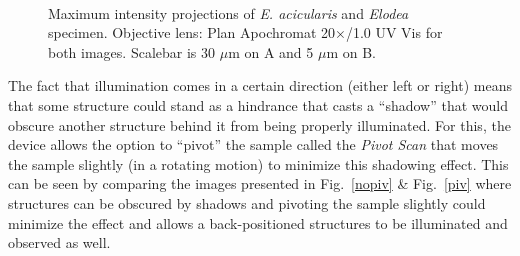\begin{figure}[h!]
\centering
{}\hspace{0.1mm}
\\
\caption{Maximum intensity projections of \textit{E. acicularis} and \textit{Elodea} specimen. 
Objective lens: Plan Apochromat 20$\times$/1.0 UV Vis for both images. 
Scalebar is 30 $\mu$m on A and 5 $\mu$m on B.}
\label{fig:EEmip}
\end{figure}

The fact that illumination comes in a certain direction (either left or right) means that some structure could stand as a hindrance that casts a ``shadow'' that would obscure another structure behind it from being properly illuminated. 
For this, the device allows the option to ``pivot'' the sample called the \textit{Pivot Scan} that moves the sample slightly (in a rotating motion) to minimize this shadowing effect. 
This can be seen by comparing the images presented in Fig.~\ref{nopiv} \& Fig.~\ref{piv} where structures can be obscured by shadows and pivoting the sample slightly could minimize the effect and allows a back-positioned structures to be illuminated and observed as well.

